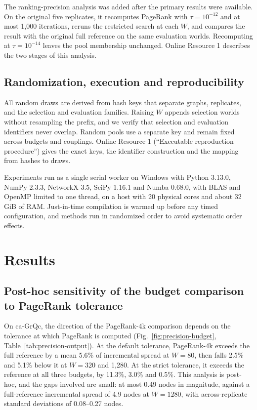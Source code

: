 \documentclass[smallextended]{svjour3}
\begin{document}
The ranking-precision analysis was added after the primary results were available. On the original five replicates, it recomputes PageRank with $\tau=10^{-12}$ and at most 1,000 iterations, reruns the restricted search at each $W$, and compares the result with the original full reference on the same evaluation worlds. Recomputing at $\tau=10^{-14}$ leaves the pool membership unchanged. Online Resource 1 describes the two stages of this analysis.

\subsection{Randomization, execution and reproducibility}
All random draws are derived from hash keys that separate graphs, replicates, and the selection and evaluation families. Raising $W$ appends selection worlds without resampling the prefix, and we verify that selection and evaluation identifiers never overlap. Random pools use a separate key and remain fixed across budgets and couplings. Online Resource 1 (``Executable reproduction procedure'') gives the exact keys, the identifier construction and the mapping from hashes to draws.

Experiments run as a single serial worker on Windows with Python 3.13.0, NumPy 2.3.3, NetworkX 3.5, SciPy 1.16.1 and Numba 0.68.0, with BLAS and OpenMP limited to one thread, on a host with 20 physical cores and about 32 GiB of RAM. Just-in-time compilation is warmed up before any timed configuration, and methods run in randomized order to avoid systematic order effects.

\section{Results}
\subsection{Post-hoc sensitivity of the budget comparison to PageRank tolerance}
On ca-GrQc, the direction of the PageRank-4k comparison depends on the tolerance at which PageRank is computed (Fig.~\ref{fig:precision-budget}, Table~\ref{tab:precision-output}). At the default tolerance, PageRank-4k exceeds the full reference by a mean 5.6\% of incremental spread at $W=80$, then falls 2.5\% and 5.1\% below it at $W=320$ and 1,280. At the strict tolerance, it exceeds the reference at all three budgets, by 11.3\%, 3.0\% and 0.5\%. This analysis is post-hoc, and the gaps involved are small: at most 0.49 nodes in magnitude, against a full-reference incremental spread of 4.9 nodes at $W=1280$, with across-replicate standard deviations of 0.08--0.27 nodes.
\end{document}
